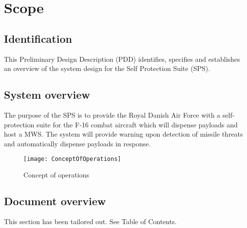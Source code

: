 \documentclass[Main]{subfiles}
\begin{document}
\chapter{Scope}

\section{Identification}
This Preliminary Design Description (PDD) identifies, specifies and establishes an overview of the system design for the Self Protection Suite (SPS).

\section{System overview}
The purpose of the SPS is to provide the Royal Danish Air Force with a self-protection suite for the F-16 combat aircraft which will dispense payloads and host a MWS. 
The system will provide warning upon detection of missile threats and automatically dispense payloads in response.

\begin{figure}[H]
\centering
\texttt{[image: ConceptOfOperations]}
\caption{Concept of operations}
\end{figure}


\section{Document overview}
This section has been tailored out. See Table of Contents.
\end{document}
